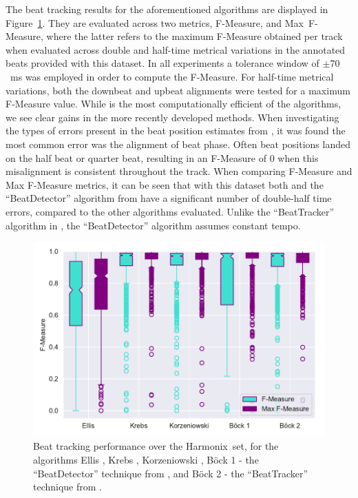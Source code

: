 \documentclass{article}
\newcommand{\setName}{Harmonix}
\begin{document}
The beat tracking results for the aforementioned algorithms are displayed in Figure~\ref{fig:beat_results}. They are evaluated across two metrics,
F-Measure, and Max~F-Measure, where the latter refers to the maximum F-Measure obtained per track when evaluated across double and half-time metrical variations
in the annotated beats provided with this dataset. In all experiments a tolerance window of  $\pm 70$~ms was employed in order to compute the F-Measure. For half-time metrical variations, both the downbeat and upbeat alignments were tested for a maximum F-Measure
value. While \cite{Ellis2007} is the most computationally efficient of the algorithms, we see clear gains in the more recently developed methods. When investigating the types
of errors present in the beat position estimates from \cite{Ellis2007}, it was found the most common error was the alignment of beat phase. Often beat positions landed
on the half beat or quarter beat, resulting in an F-Measure of 0 when this misalignment is consistent throughout the track.
When comparing F-Measure and Max F-Measure metrics, it can be seen that with 
this dataset both \cite{Ellis2007} and the ``BeatDetector'' algorithm from \cite{Bock2011} have a significant number of double-half time errors, compared to the other algorithms evaluated.
Unlike the ``BeatTracker'' algorithm in \cite{Bock2011}, the ``BeatDetector'' algorithm assumes constant tempo.

\begin{figure}
    \centerline{\includegraphics[width=\columnwidth]{figs/2019_06_27_17_45_24_Beat_Tracking_ResF-Measure.pdf}}
    \caption{Beat tracking performance over the \setName~set, for the algorithms Ellis \cite{Ellis2007}, Krebs \cite{Krebs2015}, Korzeniowski \cite{Korzeniowski2014}, B{\"o}ck 1 - the ``BeatDetector'' technique from \cite{Bock2011}, and B{\"o}ck 2 - the ``BeatTracker'' technique from \cite{Bock2011}.}
    \label{fig:beat_results}
\end{figure}
\end{document}
